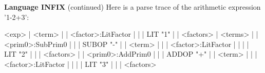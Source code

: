 \begin{minipage}[t]{\sw}
\slidenumber
\LARGE
{\bf Language INFIX} (continued)\exx
Here is a parse trace of the arithmetic expression '1-2+3':
\begin{qv}
<exp>
| <term>
| | <factor>:LitFactor
| | | LIT "1"
| | <factors>
| <terms>
| | <prim0>:SubPrim0
| | | SUBOP "-"
| | <term>
| | | <factor>:LitFactor
| | | | LIT "2"
| | | <factors>
| | <prim0>:AddPrim0
| | | ADDOP "+"
| | <term>
| | | <factor>:LitFactor
| | | | LIT "3"
| | | <factors>
\end{qv}
\end{minipage}
